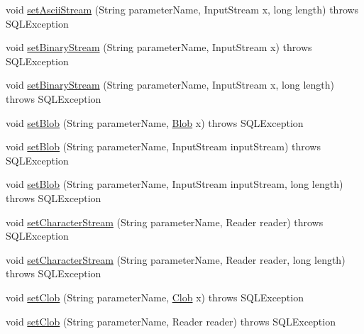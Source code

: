 \begin{DoxyCompactItemize}
\item 
void \mbox{\hyperlink{classcom_1_1mysql_1_1cj_1_1jdbc_1_1_callable_statement_a329a1f253c6e16eb93caabb187fc30f6}{set\+Ascii\+Stream}} (String parameter\+Name, Input\+Stream x, long length)  throws S\+Q\+L\+Exception 
\item 
void \mbox{\hyperlink{classcom_1_1mysql_1_1cj_1_1jdbc_1_1_callable_statement_a9266c20a0842adfeca30fe7fbb3cf76b}{set\+Binary\+Stream}} (String parameter\+Name, Input\+Stream x)  throws S\+Q\+L\+Exception 
\item 
void \mbox{\hyperlink{classcom_1_1mysql_1_1cj_1_1jdbc_1_1_callable_statement_aa36ee2696fb6f22333d0e8c59dcc5d93}{set\+Binary\+Stream}} (String parameter\+Name, Input\+Stream x, long length)  throws S\+Q\+L\+Exception 
\item 
void \mbox{\hyperlink{classcom_1_1mysql_1_1cj_1_1jdbc_1_1_callable_statement_ae0e2596de05204678b8caa247366b7f8}{set\+Blob}} (String parameter\+Name, \mbox{\hyperlink{classcom_1_1mysql_1_1cj_1_1jdbc_1_1_blob}{Blob}} x)  throws S\+Q\+L\+Exception 
\item 
void \mbox{\hyperlink{classcom_1_1mysql_1_1cj_1_1jdbc_1_1_callable_statement_a862ed16900aced622be6e676349d85c2}{set\+Blob}} (String parameter\+Name, Input\+Stream input\+Stream)  throws S\+Q\+L\+Exception 
\item 
void \mbox{\hyperlink{classcom_1_1mysql_1_1cj_1_1jdbc_1_1_callable_statement_a7d84e8ba7421f23ebe2a024cedd2f67a}{set\+Blob}} (String parameter\+Name, Input\+Stream input\+Stream, long length)  throws S\+Q\+L\+Exception 
\item 
void \mbox{\hyperlink{classcom_1_1mysql_1_1cj_1_1jdbc_1_1_callable_statement_a59ba89c0a75b368c818f72cfaa69209b}{set\+Character\+Stream}} (String parameter\+Name, Reader reader)  throws S\+Q\+L\+Exception 
\item 
void \mbox{\hyperlink{classcom_1_1mysql_1_1cj_1_1jdbc_1_1_callable_statement_a4dd5f3eb90bd5aec28008772eab958fa}{set\+Character\+Stream}} (String parameter\+Name, Reader reader, long length)  throws S\+Q\+L\+Exception 
\item 
void \mbox{\hyperlink{classcom_1_1mysql_1_1cj_1_1jdbc_1_1_callable_statement_a7f54a9f87ebdf219de9940389d32f3d1}{set\+Clob}} (String parameter\+Name, \mbox{\hyperlink{classcom_1_1mysql_1_1cj_1_1jdbc_1_1_clob}{Clob}} x)  throws S\+Q\+L\+Exception 
\item 
void \mbox{\hyperlink{classcom_1_1mysql_1_1cj_1_1jdbc_1_1_callable_statement_a4e6b7cc4dbd931dcb5bb35e40930ef23}{set\+Clob}} (String parameter\+Name, Reader reader)  throws S\+Q\+L\+Exception 

\end{DoxyCompactItemize}
